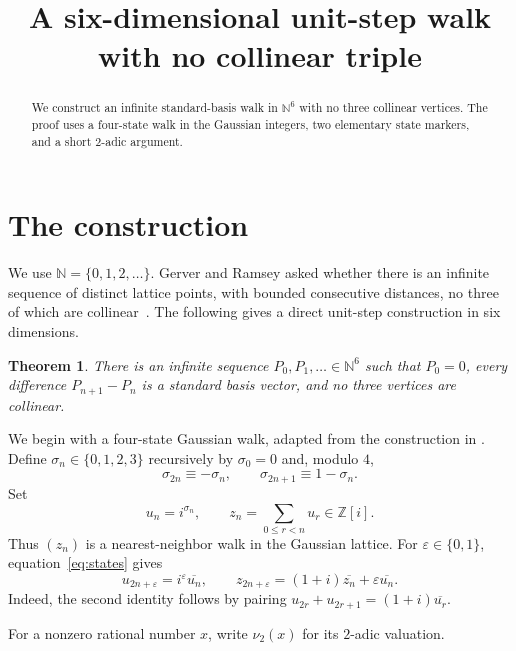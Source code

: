 \documentclass[10pt,reqno]{amsart}
\title{A six-dimensional unit-step walk with no collinear triple}
\date{}
\newcommand{\vTwo}{\nu_2}
\newtheorem{theorem}{Theorem}
\newcommand{\N}{\mathbb N}
\newcommand{\Z}{\mathbb Z}
\newcommand{\vTwo}{\nu_2}
\begin{document}
\begin{abstract}
We construct an infinite standard-basis walk in $\N^6$ with no three
collinear vertices.  The proof uses a four-state walk in the Gaussian
integers, two elementary state markers, and a short $2$-adic argument.
\end{abstract}

\maketitle

\section{The construction}

We use $\N=\{0,1,2,\ldots\}$.  Gerver and Ramsey asked whether there is an
infinite sequence of distinct lattice points, with bounded consecutive
distances, no three of which are collinear~\cite{GR}.  The following gives a
direct unit-step construction in six dimensions.

\begin{theorem}\label{thm:main}
There is an infinite sequence $P_0,P_1,\ldots\in\N^6$ such that $P_0=0$,
every difference $P_{n+1}-P_n$ is a standard basis vector, and no three
vertices are collinear.
\end{theorem}

We begin with a four-state Gaussian walk, adapted from the construction in
\cite{CK}.  Define $\sigma_n\in\{0,1,2,3\}$ recursively by $\sigma_0=0$ and,
modulo $4$,
\begin{equation}\label{eq:states}
 \sigma_{2n}\equiv-\sigma_n,
 \qquad
 \sigma_{2n+1}\equiv1-\sigma_n.
\end{equation}
Set
\begin{equation}\label{eq:gaussian}
 u_n=i^{\sigma_n},
 \qquad
 z_n=\sum_{0\le r<n}u_r\in\Z[i].
\end{equation}
Thus $(z_n)$ is a nearest-neighbor walk in the Gaussian lattice.  For
$\varepsilon\in\{0,1\}$, equation~\eqref{eq:states} gives
\begin{equation}\label{eq:dyadic}
 u_{2n+\varepsilon}=i^\varepsilon\overline{u_n},
 \qquad
 z_{2n+\varepsilon}
   =(1+i)\overline{z_n}+\varepsilon\overline{u_n}.
\end{equation}
Indeed, the second identity follows by pairing
$u_{2r}+u_{2r+1}=(1+i)\overline{u_r}$.

For a nonzero rational number $x$, write $\vTwo(x)$ for its $2$-adic
valuation.
\end{document}
